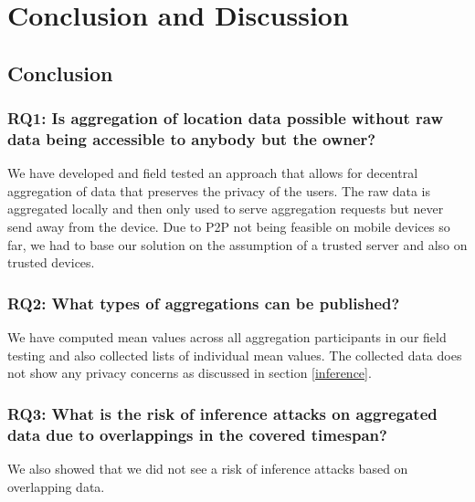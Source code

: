 \chapter{Conclusion and Discussion}\label{chapter:conclusion}
\section{Conclusion}
\subsection*{RQ1: Is aggregation of location data possible without raw data being accessible to anybody but the owner?}
We have developed and field tested an approach that allows for decentral aggregation of data that preserves the privacy of the users. The raw data is aggregated locally and then only used to serve aggregation requests but never send away from the device. Due to P2P not being feasible on mobile devices so far, we had to base our solution on the assumption of a trusted server and also on trusted devices.
\subsection*{RQ2: What types of aggregations can be published?}
We have computed mean values across all aggregation participants in our field testing and also collected lists of individual mean values. The collected data does not show any privacy concerns as discussed in section \ref{inference}.
\subsection*{RQ3: What is the risk of inference attacks on aggregated data due to overlappings in the covered timespan?}
We also showed that we did not see a risk of inference attacks based on overlapping data.


